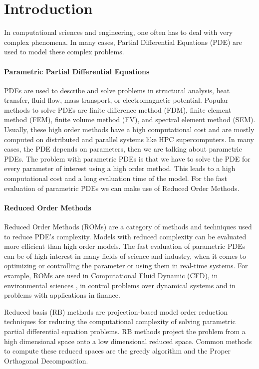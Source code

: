 \chapter{Introduction}
In computational sciences and engineering, one often has to deal with very complex phenomena.
In many cases, Partial Differential Equations (PDE) are used to model these complex problems.

\subsubsection{Parametric Partial Differential Equations}
PDEs are used to describe and solve problems in structural analysis, heat transfer, fluid flow, mass transport, or electromagnetic potential. 
Popular methods to solve PDEs are finite difference method (FDM), finite element method (FEM), finite volume method (FV), and spectral element method (SEM). Usually, these high order methods have a high computational cost and are mostly computed on distributed and parallel systems like HPC supercomputers.
In many cases, the PDE depends on parameters, then we are talking about parametric PDEs.
The problem with parametric PDEs is that we have to solve the PDE for every parameter of interest using a high order method. 
This leads to a high computational cost and a long evaluation time of the model.
For the fast evaluation of parametric PDEs we can make use of Reduced Order Methods.

\subsubsection{Reduced Order Methods}
Reduced Order Methods (ROMs) are a category of methods and techniques used to reduce PDE's complexity.
Models with reduced complexity can be evaluated more efficient than high order models.
The fast evaluation of parametric PDEs can be of high interest in many fields of science and industry, when it comes to optimizing or controlling the parameter or using them in real-time systems.
For example, ROMs are used in Computational Fluid Dynamic (CFD), in environmental sciences \cite{StrazzulloBallarinMosettiRozza2017}, in control problems over dynamical systems \cite{quarteroni2007reduced} and in problems with applications in finance.

Reduced basis (RB) methods are projection-based model order reduction techniques for reducing the computational complexity of solving parametric partial differential equation problems.
RB methods project the problem from a high dimensional space onto a low dimensional reduced space.
Common methods to compute these reduced spaces are the greedy algorithm and the Proper Orthogonal Decomposition.

